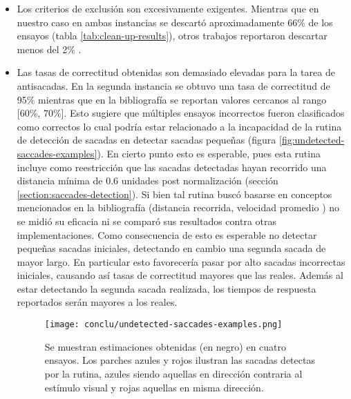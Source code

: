   \begin{itemize}

    \item
      Los criterios de exclusión son excesivamente exigentes.
      Mientras que en nuestro caso en ambas instancias se descartó
      aproximadamente 66\% de los ensayos (tabla \ref{tab:clean-up-results}),
      otros trabajos reportaron descartar menos del 2\%
      \cite{unsworth_2011_distribution_analysis}.

    \item
      Las tasas de correctitud obtenidas son demasiado elevadas para la tarea
      de antisacadas.
      En la segunda instancia se obtuvo una tasa de correctitud de 95\%
      mientras que en la bibliografía se reportan valores cercanos al rango
      [60\%, 70\%].
      Esto sugiere que múltiples ensayos incorrectos fueron clasificados como
      correctos lo cual podría estar relacionado a la incapacidad de la rutina
      de detección de sacadas en detectar sacadas pequeñas (figura
      \ref{fig:undetected-saccades-examples}).
      En cierto punto esto es esperable, pues esta rutina incluye como
      reestricción que las sacadas detectadas hayan recorrido una distancia
      mínima de 0.6 unidades post normalización (sección
      \ref{section:saccades-detection}).
      Si bien tal rutina buscó basarse en conceptos mencionados en la
      bibliografía (distancia recorrida, velocidad promedio
      \cite{stuart_2019_saccade_detection_algorithms}) no se midió su eficacia
      ni se comparó sus resultados contra otras implementaciones.
      Como consecuencia de esto es esperable no detectar pequeñas sacadas
      iniciales, detectando en cambio una segunda sacada de mayor largo.
      En particular esto favorecería pasar por alto sacadas incorrectas
      iniciales, causando así tasas de correctitud mayores que las reales.
      Además al estar detectando la segunda sacada realizada, los tiempos de
      respuesta reportados serán mayores a los reales.

      \begin{figure}
        \centering

        \texttt{[image: conclu/undetected-saccades-examples.png]}

        Se muestran estimaciones obtenidas (en negro) en cuatro ensayos.
        Los parches azules y rojos ilustran las sacadas detectas por la rutina,
        azules siendo aquellas en dirección contraria al estímulo visual y
        rojas aquellas en misma dirección.


\end{figure}
\end{itemize}
